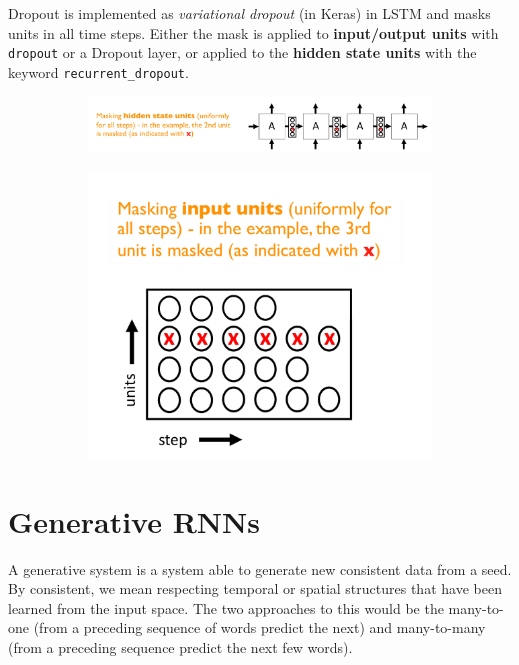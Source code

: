 \documentclass[11pt]{article}
\begin{document}
Dropout is implemented as \emph{variational dropout} (in Keras) in LSTM and masks units in all time steps. Either the mask is applied to \textbf{input/output units} with \texttt{dropout} or a Dropout layer, or applied to the \textbf{hidden state units} with the keyword \texttt{recurrent_dropout}.

\begin{figure}[H]
	\begin{subfigure}{0.7\linewidth}
		\centering
		\includegraphics[width=\linewidth]{rnn_mask_hidden}
	\end{subfigure}
	\begin{subfigure}{0.25\linewidth}
		\centering
		\includegraphics[width=\linewidth]{rnn_mask_input}
	\end{subfigure}
\end{figure}

\section{Generative RNNs}
A generative system is a system able to generate new consistent data from a seed. By consistent, we mean respecting temporal or spatial structures that have been learned from the input space. The two approaches to this would be the many-to-one (from a preceding sequence of words predict the next) and many-to-many (from a preceding sequence predict the next few words).
\end{document}
